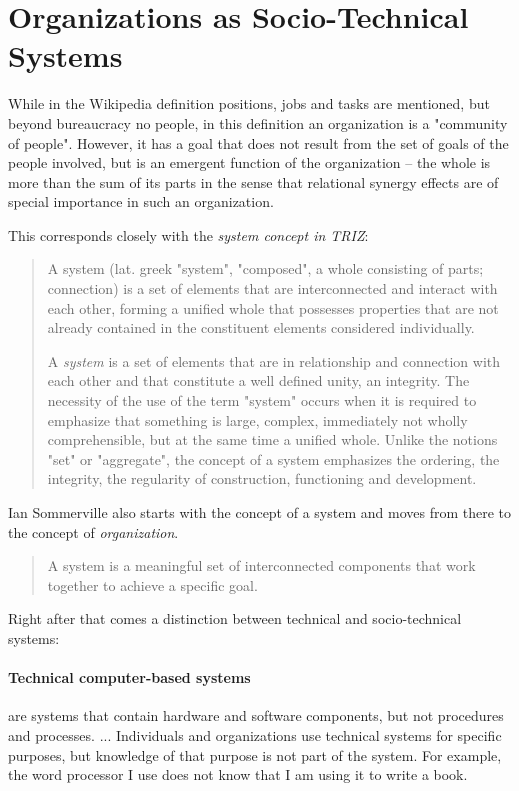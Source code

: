 \documentclass[11pt,a4paper]{article}
\begin{document}
\section{Organizations as Socio-Technical Systems}

While in the Wikipedia definition positions, jobs and tasks are mentioned, but
beyond bureaucracy no people, in this definition an organization is a
"community of people". However, it has a goal that does not result from the
set of goals of the people involved, but is an emergent function of the
organization -- the whole is more than the sum of its parts in the sense that
relational synergy effects are of special importance in such an organization.

This corresponds closely with the \emph{system concept in TRIZ}:
\begin{quote}
  A system (lat. greek "system", "composed", a whole consisting of parts;
  connection) is a set of elements that are interconnected and interact with
  each other, forming a unified whole that possesses properties that are not
  already contained in the constituent elements considered individually.
  \cite{Petrov2020}

  A \emph{system} is a set of elements that are in relationship and connection
  with each other and that constitute a well defined unity, an integrity. The
  necessity of the use of the term "system" occurs when it is required to
  emphasize that something is large, complex, immediately not wholly
  comprehensible, but at the same time a unified whole. Unlike the notions
  "set" or "aggregate", the concept of a system emphasizes the ordering, the
  integrity, the regularity of construction, functioning and development.
  \cite{TOP}
\end{quote}

Ian Sommerville \cite{Sommerville2015} also starts with the concept of a
system and moves from there to the concept of \emph{organization}.
\begin{quote}
  A system is a meaningful set of interconnected components that work together
  to achieve a specific goal.  \cite{Sommerville2015}
\end{quote}
Right after that comes a distinction between technical and socio-technical
systems:

\paragraph{Technical computer-based systems}
are systems that contain hardware and software components, but not procedures
and processes. ... Individuals and organizations use technical systems for
specific purposes, but knowledge of that purpose is not part of the system.
For example, the word processor I use does not know that I am using it to
write a book.
\end{document}
